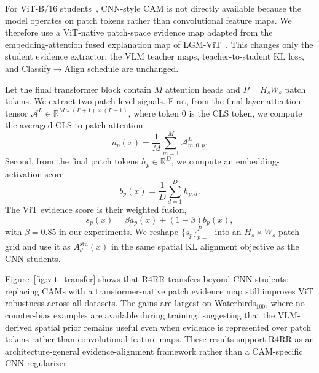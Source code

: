 For ViT-B/16 students~\cite{dosovitskiy2020image}, CNN-style CAM is not directly available because the model operates on patch tokens rather than convolutional feature maps. We therefore use a ViT-native patch-space evidence map adapted from the embedding-attention fused explanation map of LGM-ViT~\cite{ben2024localization}. This changes only the student evidence extractor: the VLM teacher maps, teacher-to-student KL loss, and Classify$\rightarrow$Align schedule are unchanged.

Let the final transformer block contain $M$ attention heads and $P=H_sW_s$ patch tokens. We extract two patch-level signals. First, from the final-layer attention tensor $\mathcal{A}^{L}\in\mathbb{R}^{M\times(P+1)\times(P+1)}$, where token $0$ is the CLS token, we compute the averaged CLS-to-patch attention
\begin{equation}
a_p(x)=\frac{1}{M}\sum_{m=1}^{M}\mathcal{A}^{L}_{m,0,p}.
\end{equation}
Second, from the final patch tokens $h_p\in\mathbb{R}^{D}$, we compute an embedding-activation score
\begin{equation}
b_p(x)=\frac{1}{D}\sum_{d=1}^{D}h_{p,d}.
\end{equation}
The ViT evidence score is their weighted fusion,
\begin{equation}
s_p(x)=\beta a_p(x)+(1-\beta)b_p(x),
\end{equation}
with $\beta=0.85$ in our experiments. We reshape $\{s_p\}_{p=1}^{P}$ into an $H_s\times W_s$ patch grid and use it as $A^{\mathrm{stu}}_\theta(x)$ in the same spatial KL alignment objective as the CNN students.


Figure~\ref{fig:vit_transfer} shows that R4RR transfers beyond CNN students: replacing CAMs with a transformer-native patch evidence map still improves ViT robustness across all datasets. The gains are largest on Waterbirds$_{100}$, where no counter-bias examples are available during training, suggesting that the VLM-derived spatial prior remains useful even when evidence is represented over patch tokens rather than convolutional feature maps. These results support R4RR as an architecture-general evidence-alignment framework rather than a CAM-specific CNN regularizer.



